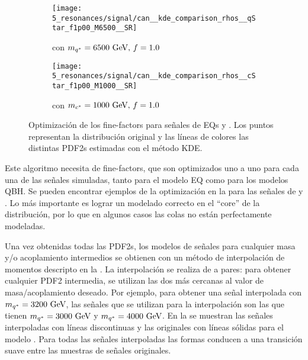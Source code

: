 \begin{figure}[ht!]
    \centering
    \begin{subfigure}[h]{0.49\linewidth}
        \centering
        \texttt{[image: 5\_resonances/signal/can\_\_kde\_comparison\_rhos\_\_qStar\_f1p00\_M6500\_\_SR]}
        \caption{\qstar con \(m_{q^*} = 6500~\text{GeV},\, f=1.0\)}
        \label{fig:signals:modeling:fine_factor_optimization_qstar}
    \end{subfigure}
    \begin{subfigure}[h]{0.49\linewidth}
        \centering
        \texttt{[image: 5\_resonances/signal/can\_\_kde\_comparison\_rhos\_\_cStar\_f1p00\_M1000\_\_SR]}
        \caption{\cstar con \(m_{c^*} = 1000~\text{GeV},\, f=1.0\)}
        \label{fig:signals:modeling:fine_factor_optimization_cstar}
    \end{subfigure}
    \caption{Optimización de los fine-factors para señales de \acp{EQ} \qstar y \cstar. Los puntos representan la distribución original y las líneas de colores las distintas \acp{PDF2} estimadas con el método \ac{KDE}.}
    \label{fig:signals:modeling:fine_factor_optimization}
\end{figure}

Este algoritmo necesita de fine-factors, que son optimizados uno a uno para cada una de las señales simuladas, tanto para el modelo \ac{EQ} como para los modelos \ac{QBH}. Se pueden encontrar ejemplos de la optimización en la \Fig{\ref{fig:signals:modeling:fine_factor_optimization}} para las señales de \qstar y \cstar. Lo más importante es lograr un modelado correcto en el \enquote{core} de la distribución, por lo que en algunos casos las colas no están perfectamente modeladas.

Una vez obtenidas todas las \acp{PDF2}, los modelos de señales para cualquier masa y/o acoplamiento intermedios se obtienen con un método de interpolación de momentos descripto en la . La interpolación se realiza de a pares: para obtener cualquier \ac{PDF2} intermedia, se utilizan las dos más cercanas al valor de masa/acoplamiento deseado. Por ejemplo, para obtener una señal interpolada con \(m_{q^*} = 3200~\text{GeV}\), las señales que se utilizan para la interpolación son las que tienen \(m_{q^*} = 3000~\text{GeV}\) y \(m_{q^*} = 4000~\text{GeV}\).
En la \Fig{\ref{fig:signals:modeling:final_interpolation}} se muestran las señales interpoladas con líneas discontinuas y las originales con líneas sólidas para el modelo \qstar. Para todas las señales interpoladas las formas conducen a una transición suave entre las muestras de señales originales.



